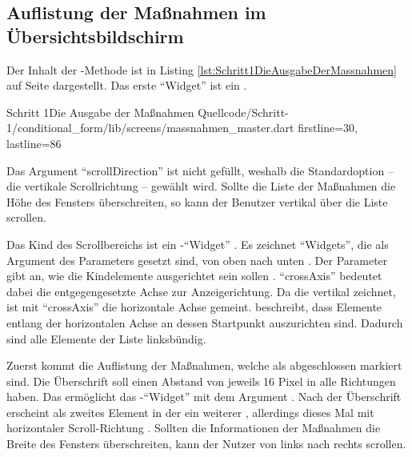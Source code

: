 \subsection{Auflistung der Maßnahmen im Übersichtsbildschirm}

Der Inhalt der -Methode ist in Listing \ref{lst:Schritt1DieAusgabeDerMassnahmen} auf Seite \pageref{lst:Schritt1DieAusgabeDerMassnahmen} dargestellt.
Das erste \enquote{Widget} ist ein  .
\begin{alexlisting}{Schritt 1}{Die Ausgabe der Maßnahmen}
  {Quellcode/Schritt-1/conditional_form/lib/screens/massnahmen_master.dart}
  {firstline=30, lastline=86}
  \label{lst:Schritt1DieAusgabeDerMassnahmen}
\end{alexlisting}

Das Argument \enquote{scrollDirection} ist nicht gefüllt, weshalb die Standardoption -- die vertikale Scrollrichtung -- gewählt wird.
Sollte die Liste der Maßnahmen die Höhe des Fensters überschreiten, so kann der Benutzer vertikal über die Liste scrollen.



Das Kind des Scrollbereichs ist ein -\enquote{Widget} .
Es zeichnet \enquote{Widgets}, die als Argument des Parameters  gesetzt sind, von oben nach unten .
Der Parameter  gibt an, wie die Kindelemente ausgerichtet sein sollen .
\enquote{crossAxis} bedeutet dabei die entgegengesetzte Achse zur Anzeigerichtung.
Da die  vertikal zeichnet, ist mit \enquote{crossAxis} die horizontale Achse gemeint.
 beschreibt, dass Elemente entlang der horizontalen Achse an dessen Startpunkt auszurichten sind. Dadurch sind alle Elemente der Liste linksbündig.

Zuerst kommt die Auflistung der Maßnahmen, welche als abgeschlossen markiert sind.
Die Überschrift   soll einen Abstand von jeweils 16 Pixel in alle Richtungen haben.
Das ermöglicht das -\enquote{Widget}   mit dem Argument .
Nach der Überschrift erscheint als zweites Element in der  ein weiterer  ,
allerdings dieses Mal mit horizontaler Scroll-Richtung .
Sollten die Informationen der Maßnahmen die Breite des Fensters überschreiten, kann der Nutzer von links nach rechts scrollen.


